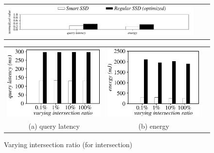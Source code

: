 



\begin{figure}[tbp]
\centering
\begin{tabular}{ccc}
\includegraphics[width=0.52\columnwidth]{figures/banner2.pdf}
\end{tabular}
\vspace{-0.1cm}
\renewcommand{\tabcolsep}{0.1mm}
\begin{tabular}{ccc}
\includegraphics[width=0.5\columnwidth]{figures/Intersection-time-VaryInterRatio.eps}&
\includegraphics[width=0.5\columnwidth]{figures/Intersection-energy-VaryInterRatio.eps}\\
(a) query latency & (b) energy
\end{tabular}
\caption{Varying intersection ratio (for intersection)}
\label{fig:varyInterRatioIntersection1}
\end{figure}




